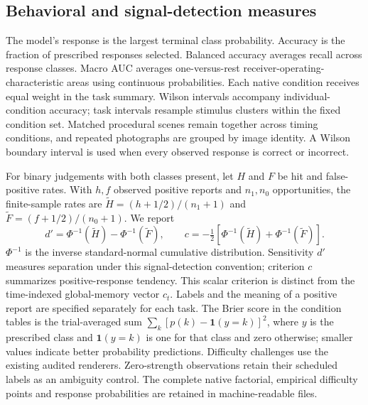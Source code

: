 \documentclass[11pt]{article}
\begin{document}
\subsection{Behavioral and signal-detection measures}
The model's response is the largest terminal class probability. Accuracy is the fraction of prescribed responses selected. Balanced accuracy averages recall across response classes. Macro AUC averages one-versus-rest receiver-operating-characteristic areas using continuous probabilities. Each native condition receives equal weight in the task summary. Wilson intervals accompany individual-condition accuracy; task intervals resample stimulus clusters within the fixed condition set. Matched procedural scenes remain together across timing conditions, and repeated photographs are grouped by image identity. A Wilson boundary interval is used when every observed response is correct or incorrect.

For binary judgements with both classes present, let $H$ and $F$ be hit and false-positive rates. With $h,f$ observed positive reports and $n_1,n_0$ opportunities, the finite-sample rates are $\widetilde H=(h+1/2)/(n_1+1)$ and $\widetilde F=(f+1/2)/(n_0+1)$. We report
\begin{equation}
 d'=\Phi^{-1}(\widetilde H)-\Phi^{-1}(\widetilde F),\qquad
 c=-\tfrac12[\Phi^{-1}(\widetilde H)+\Phi^{-1}(\widetilde F)].
\end{equation}
$\Phi^{-1}$ is the inverse standard-normal cumulative distribution. Sensitivity $d'$ measures separation under this signal-detection convention; criterion $c$ summarizes positive-response tendency. This scalar criterion is distinct from the time-indexed global-memory vector $c_t$. Labels and the meaning of a positive report are specified separately for each task. The Brier score in the condition tables is the trial-averaged sum $\sum_k[p(k)-\mathbf 1(y=k)]^2$, where $y$ is the prescribed class and $\mathbf 1(y=k)$ is one for that class and zero otherwise; smaller values indicate better probability predictions. Difficulty challenges use the existing audited renderers. Zero-strength observations retain their scheduled labels as an ambiguity control. The complete native factorial, empirical difficulty points and response probabilities are retained in machine-readable files.
\end{document}
